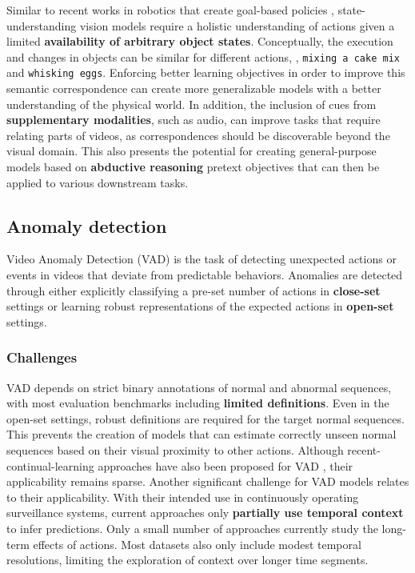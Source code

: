 Similar to recent works in robotics that create goal-based policies , state-understanding vision models require a holistic understanding of actions given a limited \textbf{availability of arbitrary object states}. Conceptually, the execution and changes in objects can be similar for different actions, \eg, \texttt{mixing a cake mix} and \texttt{whisking eggs}. Enforcing better learning objectives in order to improve this semantic correspondence can create more generalizable models with a better understanding of the physical world. In addition, the inclusion of cues from \textbf{supplementary modalities}, such as audio, can improve tasks that require relating parts of videos, as correspondences should be discoverable beyond the visual domain. This also presents the potential for creating general-purpose models based on \textbf{abductive reasoning} pretext objectives that can then be applied to various downstream tasks.



\subsection{Anomaly detection}
\label{sec:prediction::VAD}

Video Anomaly Detection (VAD) is the task of detecting unexpected actions or events in videos that deviate from predictable behaviors. Anomalies are detected through either explicitly classifying a pre-set number of actions in \textbf{close-set} settings or learning robust representations of the expected actions in \textbf{open-set} settings.


\subsubsection{Challenges}
\label{sec:prediction::VAD:::challenges}

VAD depends on strict binary annotations of normal and abnormal sequences, with most evaluation benchmarks including \textbf{limited definitions}. Even in the open-set settings, robust definitions are required for the target normal sequences. This prevents the creation of models that can estimate correctly unseen normal sequences based on their visual proximity to other actions. Although recent-continual-learning approaches have also been proposed for VAD , their applicability remains sparse. Another significant challenge for VAD models relates to their applicability. With their intended use in continuously operating surveillance systems, current approaches only \textbf{partially use temporal context} to infer predictions. Only a small number of approaches currently study the long-term effects of actions. Most datasets also only include modest temporal resolutions, limiting the exploration of context over longer time segments.



